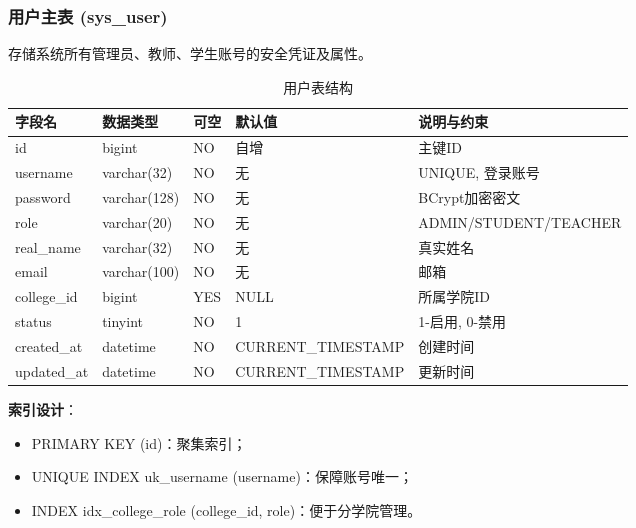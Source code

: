 \documentclass{../template/softeng}
\begin{document}
	\subsubsection{用户主表 (sys\_user)}
	存储系统所有管理员、教师、学生账号的安全凭证及属性。
	\begin{table}[htbp]
		\centering
		\begin{tabular}{|l|l|l|l|l|}
			\hline
			\textbf{字段名} & \textbf{数据类型} & \textbf{可空} & \textbf{默认值} & \textbf{说明与约束} \\
			\hline
			id & bigint & NO & 自增 & 主键ID \\
			username & varchar(32) & NO & 无 & UNIQUE, 登录账号 \\
			password & varchar(128) & NO & 无 & BCrypt加密密文 \\
			role & varchar(20) & NO & 无 & ADMIN/STUDENT/TEACHER \\
			real\_name & varchar(32) & NO & 无 & 真实姓名 \\
			email & varchar(100) & NO & 无 & 邮箱 \\
			college\_id & bigint & YES & NULL & 所属学院ID \\
			status & tinyint & NO & 1 & 1-启用, 0-禁用 \\
			created\_at & datetime & NO & CURRENT\_TIMESTAMP & 创建时间 \\
			updated\_at & datetime & NO & CURRENT\_TIMESTAMP & 更新时间 \\
			\hline
		\end{tabular}
		\caption{用户表结构}
	\end{table}

	\textbf{索引设计}：
	\begin{itemize}
		\item PRIMARY KEY (id)：聚集索引；
		\item UNIQUE INDEX uk\_username (username)：保障账号唯一；
		\item INDEX idx\_college\_role (college\_id, role)：便于分学院管理。
	\end{itemize}
\end{document}

